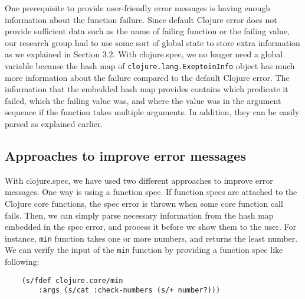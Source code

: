 \documentclass[12pt]{article}
\begin{document}
	One prerequisite to provide user-friendly error messages is having enough information about the function failure. Since 
	default Clojure error does not provide sufficient data such as the name of failing function or the failing value, our 
	research group had to use some sort of global state to store extra information as we explained in Section 3.2. 
	With clojure.spec, we no longer need a global variable because the hash map of {\tt clojure.lang.ExeptoinInfo} object 
	has much more information about the 
	failure compared to the default Clojure error. The information that the embedded hash map provides contains which predicate it 
	failed, which the failing value was, and where the value was in the argument sequence if the function takes multiple 
	arguments. In addition, they can be easily parsed as explained earlier.
	
	\subsection{Approaches to improve error messages}
	With clojure.spec, we have used two different approaches to improve error messages. One way is using a function spec. 
	If function specs are attached to the Clojure core functions, the spec error is thrown when some core function 
	call fails. Then, we can simply parse necessary information from the hash map embedded in the spec error, and 
	process it before we show them to the user. For instance, {\tt min} function 
	takes one or more numbers, and returns the least number. We can verify the input of the {\tt min} function by providing a 
	function spec like following:

	\begin{verbatim}
	(s/fdef clojure.core/min
		:args (s/cat :check-numbers (s/+ number?)))
	\end{verbatim}
\end{document}
